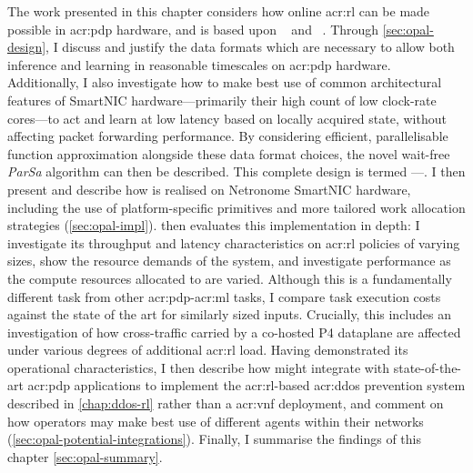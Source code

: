 The work presented in this chapter considers how online \gls{acr:rl} can be made possible in \gls{acr:pdp} hardware, and is based upon ~\parencite{DBLP:conf/conext/SimpsonP21} and ~\parencite{noms-220816}.
Through \cref{sec:opal-design}, I discuss and justify the data formats which are necessary to allow both inference and learning in reasonable timescales on \gls{acr:pdp} hardware.
Additionally, I also investigate how to make best use of common architectural features of SmartNIC hardware---primarily their high count of low clock-rate cores---to act and learn at low latency based on locally acquired state, without affecting packet forwarding performance.
By considering efficient, parallelisable function approximation alongside these data format choices, the novel wait-free \emph{ParSa} algorithm can then be described.
This complete design is termed \approachshort---\approach.
I then present and describe how \approachshort{} is realised on Netronome SmartNIC hardware, including the use of platform-specific primitives and more tailored work allocation strategies (\cref{sec:opal-impl}).
 then evaluates this implementation in depth: I investigate its throughput and latency characteristics on \gls{acr:rl} policies of varying sizes, show the resource demands of the system, and investigate performance as the compute resources allocated to \approachshort{} are varied.
Although this is a fundamentally different task from other \gls{acr:pdp}-\gls{acr:ml} tasks, I compare task execution costs against the state of the art for similarly sized inputs.
Crucially, this includes an investigation of how cross-traffic carried by a co-hosted P4 dataplane are affected under various degrees of additional \gls{acr:rl} load.
Having demonstrated its operational characteristics, I then describe how \approachshort{} might integrate with state-of-the-art \gls{acr:pdp} applications to implement the \gls{acr:rl}-based \gls{acr:ddos} prevention system described in \cref{chap:ddos-rl} rather than a \gls{acr:vnf} deployment, and comment on how operators may make best use of different \approachshort{} agents within their networks (\cref{sec:opal-potential-integrations}).
Finally, I summarise the findings of this chapter \cref{sec:opal-summary}.

